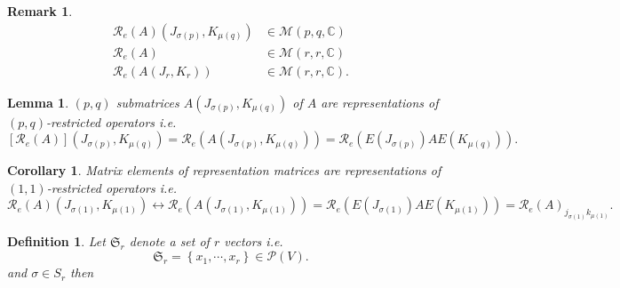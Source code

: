 \documentclass[aps,preprint]{revtex4}%
\newtheorem{corollary}[theorem]{Corollary}
\newtheorem{definition}[theorem]{Definition}
\newtheorem{lemma}[theorem]{Lemma}
\newtheorem{remark}[theorem]{Remark}
\begin{document}
\begin{remark}%
\begin{align}
\mathcal{R}_{e}\left(  A\right)  \left(  J_{\sigma\left(  p\right)  }%
,K_{\mu\left(  q\right)  }\right)   &  \in\mathbb{\mathcal{M}}\left(
p,q,\mathbb{C}\right) \\
\mathcal{R}_{e}\left(  A\right)   &  \in\mathbb{\mathcal{M}}\left(
r,r,\mathbb{C}\right) \\
\mathcal{R}_{e}\left(  A\left(  J_{r},K_{r}\right)  \right)   &
\in\mathbb{\mathcal{M}}\left(  r,r,\mathbb{C}\right)  .
\end{align}

\end{remark}

\begin{lemma}
$\left(  p,q\right)  $ submatrices $A\left(  J_{\sigma\left(  p\right)
},K_{\mu\left(  q\right)  }\right)  $ of $A$ are representations of $\left(
p,q\right)  $-restricted operators i.e.
\begin{equation}
\left[  \mathcal{R}_{e}\left(  A\right)  \right]  \left(  J_{\sigma\left(
p\right)  },K_{\mu\left(  q\right)  }\right)  =\mathcal{R}_{e}\left(  A\left(
J_{\sigma\left(  p\right)  },K_{\mu\left(  q\right)  }\right)  \right)
=\mathcal{R}_{e}\left(  E\left(  J_{\sigma\left(  p\right)  }\right)
AE\left(  K_{\mu\left(  q\right)  }\right)  \right)  .
\end{equation}

\end{lemma}

\begin{corollary}
Matrix elements of representation matrices are representations of $\left(
1,1\right)  $-restricted operators i.e.
\begin{equation}
\mathcal{R}_{e}\left(  A\right)  \left(  J_{\sigma\left(  1\right)  }%
,K_{\mu\left(  1\right)  }\right)  \leftrightarrow\mathcal{R}_{e}\left(
A\left(  J_{\sigma\left(  1\right)  },K_{\mu\left(  1\right)  }\right)
\right)  =\mathcal{R}_{e}\left(  E\left(  J_{\sigma\left(  1\right)  }\right)
AE\left(  K_{\mu\left(  1\right)  }\right)  \right)  =\mathcal{R}_{e}\left(
A\right)  _{j_{\sigma\left(  1\right)  }k_{\mu\left(  1\right)  }}.
\end{equation}

\end{corollary}

\begin{definition}
Let $\mathfrak{S}_{r}$ denote a set of $r$ vectors i.e.
\begin{equation}
\mathfrak{S}_{r}=\left\{  x_{1},\cdots,x_{r}\right\}  \in\mathcal{P}\left(
V\right)  .
\end{equation}
and $\sigma\in S_{r}$ then
\end{definition}
\end{document}
